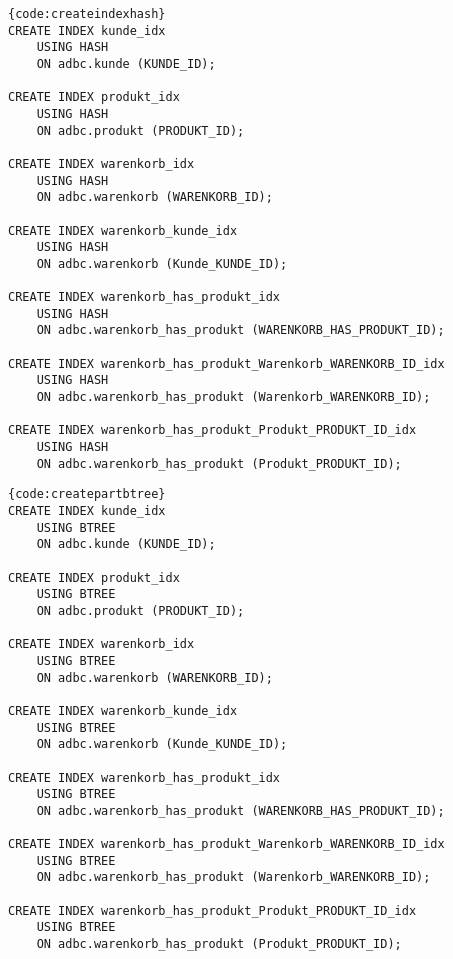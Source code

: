 \begin{lstlisting}[caption=Indexerstellung als Hash, firstnumber=1]{code:createindexhash}
CREATE INDEX kunde_idx
    USING HASH
    ON adbc.kunde (KUNDE_ID);
    
CREATE INDEX produkt_idx
    USING HASH
    ON adbc.produkt (PRODUKT_ID);
    
CREATE INDEX warenkorb_idx
    USING HASH
    ON adbc.warenkorb (WARENKORB_ID);
    
CREATE INDEX warenkorb_kunde_idx
    USING HASH
    ON adbc.warenkorb (Kunde_KUNDE_ID);
    
CREATE INDEX warenkorb_has_produkt_idx
    USING HASH
    ON adbc.warenkorb_has_produkt (WARENKORB_HAS_PRODUKT_ID);
    
CREATE INDEX warenkorb_has_produkt_Warenkorb_WARENKORB_ID_idx
    USING HASH
    ON adbc.warenkorb_has_produkt (Warenkorb_WARENKORB_ID);

CREATE INDEX warenkorb_has_produkt_Produkt_PRODUKT_ID_idx
    USING HASH
    ON adbc.warenkorb_has_produkt (Produkt_PRODUKT_ID);
\end{lstlisting}

\begin{lstlisting}[caption=Indexerstellung als B-Tree, firstnumber=1]{code:createpartbtree}
CREATE INDEX kunde_idx
    USING BTREE
    ON adbc.kunde (KUNDE_ID);
    
CREATE INDEX produkt_idx
    USING BTREE
    ON adbc.produkt (PRODUKT_ID);
    
CREATE INDEX warenkorb_idx
    USING BTREE
    ON adbc.warenkorb (WARENKORB_ID);
    
CREATE INDEX warenkorb_kunde_idx
    USING BTREE
    ON adbc.warenkorb (Kunde_KUNDE_ID);
    
CREATE INDEX warenkorb_has_produkt_idx
    USING BTREE
    ON adbc.warenkorb_has_produkt (WARENKORB_HAS_PRODUKT_ID);
    
CREATE INDEX warenkorb_has_produkt_Warenkorb_WARENKORB_ID_idx
    USING BTREE
    ON adbc.warenkorb_has_produkt (Warenkorb_WARENKORB_ID);

CREATE INDEX warenkorb_has_produkt_Produkt_PRODUKT_ID_idx
    USING BTREE
    ON adbc.warenkorb_has_produkt (Produkt_PRODUKT_ID);
\end{lstlisting}

